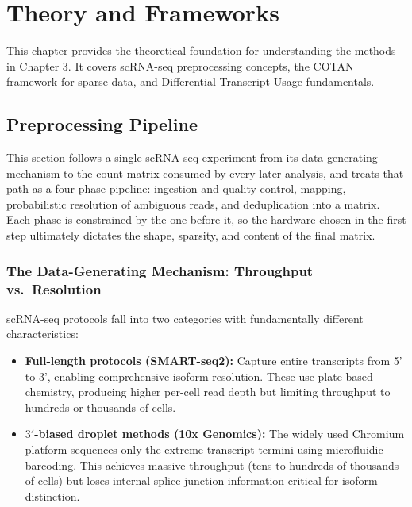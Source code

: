 \chapter{Theory and Frameworks}

This chapter provides the theoretical foundation for understanding the methods in Chapter 3. It covers scRNA-seq preprocessing concepts, the COTAN framework for sparse data, and Differential Transcript Usage fundamentals.

\section{Preprocessing Pipeline}

This section follows a single scRNA-seq experiment from its data-generating mechanism to the count matrix consumed by every later analysis, and treats that path as a four-phase pipeline: ingestion and quality control, mapping, probabilistic resolution of ambiguous reads, and deduplication into a matrix. Each phase is constrained by the one before it, so the hardware chosen in the first step ultimately dictates the shape, sparsity, and content of the final matrix.

\subsection{The Data-Generating Mechanism: Throughput vs.\ Resolution}
scRNA-seq protocols fall into two categories with fundamentally different characteristics:

\begin{itemize}
    \item \textbf{Full-length protocols (SMART-seq2):} Capture entire transcripts from 5' to 3', enabling comprehensive isoform resolution. These use plate-based chemistry, producing higher per-cell read depth but limiting throughput to hundreds or thousands of cells.
    
    \item \textbf{$3'$-biased droplet methods (10x Genomics):} The widely used Chromium platform sequences only the extreme transcript termini using microfluidic barcoding. This achieves massive throughput (tens to hundreds of thousands of cells) but loses internal splice junction information critical for isoform distinction.
\end{itemize}

